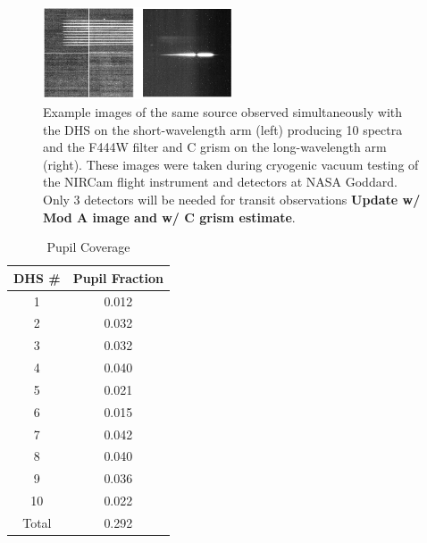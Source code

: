 \documentclass[iop]{emulateapj}
\begin{document}
\begin{figure}[!ht]
\includegraphics[width=0.5\textwidth]{dhs_image_example.png}
\caption{Example images of the same source observed simultaneously with the DHS on the short-wavelength arm (left) producing 10 spectra and the F444W filter and C grism on the long-wavelength arm (right).
These images were taken during cryogenic vacuum testing of the NIRCam flight instrument and detectors at NASA Goddard.
Only 3 detectors will be needed for transit observations \textbf{Update w/ Mod A image and w/ C grism estimate}.}\label{fig:DHSimage}
\end{figure}

\begin{table}
\centering
\begin{tabular}{cc}
DHS \# & Pupil Fraction \\
\hline \hline
1 & 0.012 \\
2 & 0.032 \\
3 &  0.032 \\
4 & 0.040 \\
5 & 0.021 \\
6 & 0.015 \\
7 & 0.042 \\
8 & 0.040 \\
9 & 0.036 \\
10 & 0.022 \\
\hline
Total & 0.292
\end{tabular}
\caption{Pupil Coverage}\label{tab:pupfrac}
\label{tab:pupfrac}
\end{table}
\end{document}

